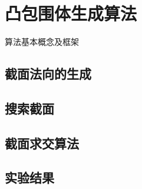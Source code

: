 

\chapter{凸包围体生成算法}
\label{cha:kcbp-construction}
算法基本概念及框架

\section{截面法向的生成}
\label{sec:gen-normals}

\section{搜索截面}
\label{sec:search-planes}

\section{截面求交算法}
\label{sec:intersect-planes}

\section{实验结果}
\label{sec:exper-kcbp}

